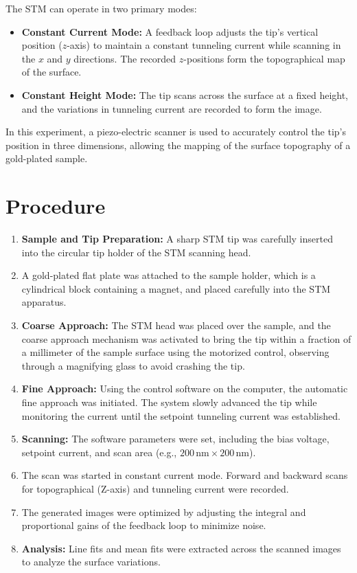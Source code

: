 \documentclass[12pt, a4paper]{article}
\begin{document}
The STM can operate in two primary modes:
\begin{itemize}
    \item \textbf{Constant Current Mode:} A feedback loop adjusts the tip's vertical position ($z$-axis) to maintain a constant tunneling current while scanning in the $x$ and $y$ directions. The recorded $z$-positions form the topographical map of the surface.
    \item \textbf{Constant Height Mode:} The tip scans across the surface at a fixed height, and the variations in tunneling current are recorded to form the image.
\end{itemize}
In this experiment, a piezo-electric scanner is used to accurately control the tip's position in three dimensions, allowing the mapping of the surface topography of a gold-plated sample.

\section{Procedure}
\begin{enumerate}
    \item \textbf{Sample and Tip Preparation:} A sharp STM tip was carefully inserted into the circular tip holder of the STM scanning head.
    \item A gold-plated flat plate was attached to the sample holder, which is a cylindrical block containing a magnet, and placed carefully into the STM apparatus.
    \item \textbf{Coarse Approach:} The STM head was placed over the sample, and the coarse approach mechanism was activated to bring the tip within a fraction of a millimeter of the sample surface using the motorized control, observing through a magnifying glass to avoid crashing the tip.
    \item \textbf{Fine Approach:} Using the control software on the computer, the automatic fine approach was initiated. The system slowly advanced the tip while monitoring the current until the setpoint tunneling current was established.
    \item \textbf{Scanning:} The software parameters were set, including the bias voltage, setpoint current, and scan area (e.g., $200\,\text{nm} \times 200\,\text{nm}$).
    \item The scan was started in constant current mode. Forward and backward scans for topographical (Z-axis) and tunneling current were recorded.
    \item The generated images were optimized by adjusting the integral and proportional gains of the feedback loop to minimize noise.
    \item \textbf{Analysis:} Line fits and mean fits were extracted across the scanned images to analyze the surface variations.

\end{enumerate}
\end{document}

